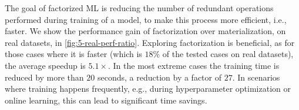The goal of factorized ML is reducing the number of redundant operations performed during training of a model, to make this process more efficient, i.e., faster. We show the performance gain of factorization over materialization, on real datasets, in \autoref{fig:5-real-perf-ratio}. Exploring factorization is beneficial, as for those cases where it is faster (which is $18\%$ of the tested cases on real datasets), the average speedup is $5.1\times$. In the most extreme cases the training time is reduced by more than $20$ seconds, a reduction by a factor of $27$. In scenarios where training happens frequently, e.g., during hyperparameter optimization or online learning, this can lead to significant time savings.


